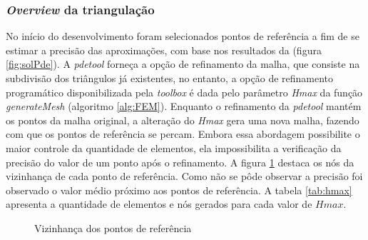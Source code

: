 \documentclass[
    12pt,               %
    openright,          %
    oneside,
    a4paper,            %
    english,            %
    french,             %
    spanish,            %
    brazil              %
    ]{abntex2}
\begin{document}
\subsubsection*{\textit{Overview} da triangulação}
No início do desenvolvimento foram selecionados pontos de referência a fim de se estimar a precisão das aproximações, com base nos resultados da  (figura \ref{fig:solPde}).
A \textit{pdetool} forneça a opção de refinamento da malha, que consiste na subdivisão dos triângulos já existentes, no entanto, a opção de refinamento programático disponibilizada pela \textit{toolbox} é dada pelo parâmetro \textit{Hmax} da função \textit{generateMesh} (algoritmo \ref{alg:FEM}). Enquanto o refinamento da \textit{pdetool} mantém os pontos da malha original, a alteração do \textit{Hmax} gera uma nova malha, fazendo com que os pontos de referência se percam. Embora essa abordagem possibilite o maior controle da quantidade de elementos, ela impossibilita a verificação da precisão do valor de um ponto após o refinamento. A figura \ref{fig:vizinha} destaca os nós da vizinhança de cada ponto de referência. Como não se pôde observar a precisão foi observado o valor médio próximo aos pontos de referência.  A tabela \ref{tab:hmax} apresenta a quantidade de elementos e nós gerados para cada valor de $Hmax$.


\begin{figure}%
	\centering	
	\qquad
	\caption{Vizinhança dos pontos de referência}%
	\label{fig:vizinha}%
\end{figure}
\end{document}
